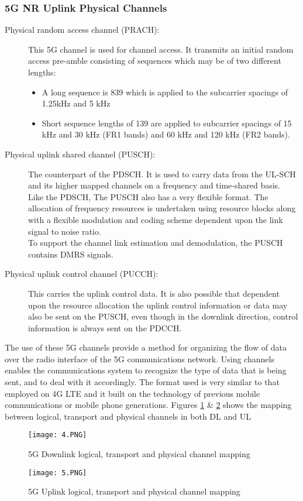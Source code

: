 \subsubsection{5G NR Uplink Physical Channels}
\begin{description}
    \item[Physical random access channel (PRACH):] This 5G channel is used for channel access. It transmits an initial random access pre-amble consisting of sequences which may be of two different lengths:
    \begin{itemize}
        \item A long sequence is 839 which is applied to the subcarrier spacings of 1.25kHz and 5 kHz
        \item Short sequence lengths of 139 are applied to subcarrier spacings of 15 kHz and 30 kHz (FR1 bands) and 60 kHz and 120 kHz (FR2 bands).
    \end{itemize}
    
    \item[Physical uplink shared channel (PUSCH):] The counterpart of the PDSCH. It is used to carry data from the UL-SCH and its higher mapped channels on a frequency and time-shared basis.\\
    Like the PDSCH, The PUSCH also has a very flexible format. The allocation of frequency resources is undertaken using resource blocks along with a flexible modulation and coding scheme dependent upon the link signal to noise ratio.\\
    To support the channel link estimation and demodulation, the PUSCH contains DMRS signals.
    \item[Physical uplink control channel (PUCCH):] This carries the uplink control data. It is also possible that dependent upon the resource allocation the uplink control information or data may also be sent on the PUSCH, even though in the downlink direction, control information is always sent on the PDCCH.
\end{description}
	
The use of these 5G channels provide a method for organizing the flow of data over the radio interface of the 5G communications network. Using channels enables the communications system to recognize the type of data that is being sent, and to deal with it accordingly. The format used is very similar to that employed on 4G LTE and it built on the technology of previous mobile communications or mobile phone generations.
\newline\newline
Figures \ref{fig:sub-first} \& \ref{fig:second} shows the mapping between logical, transport and physical channels in both DL and UL
\begin{figure}[h]
    \centering
    \texttt{[image: 4.PNG]}
    \caption{5G Downlink logical, transport and physical channel mapping}
    \label{fig:sub-first}
\end{figure}

\begin{figure}[h]
    \centering
    \texttt{[image: 5.PNG]}
    \caption{5G Uplink logical, transport and physical channel mapping}
    \label{fig:second}
\end{figure}
